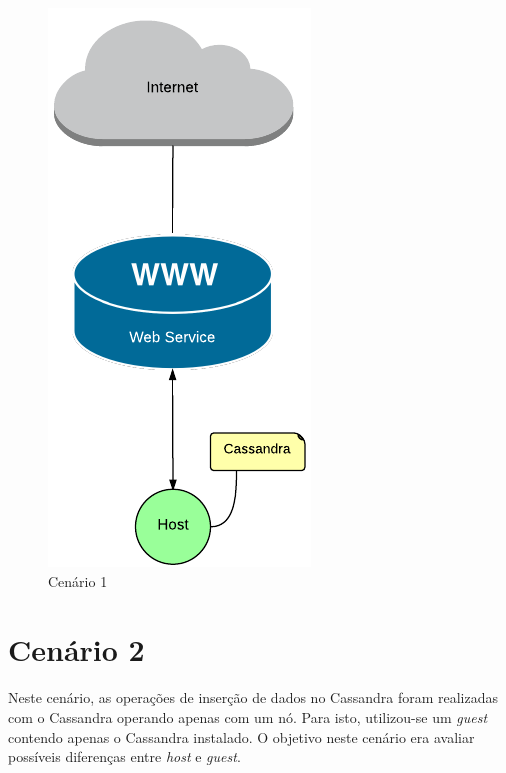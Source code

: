     \begin{figure}[H]
    \centering
    \includegraphics[scale=0.60]{imagens/BD-1Host.pdf}
    \caption{Cenário 1}
    \label{fig:bd1host}
    \end{figure} 

\section{Cenário 2}
Neste cenário, as operações de inserção de dados no Cassandra foram realizadas com o Cassandra operando apenas com um nó.
Para isto, utilizou-se um \textit{guest} contendo apenas o Cassandra instalado. O objetivo neste cenário era avaliar possíveis diferenças entre \textit{host} e \textit{guest}.

